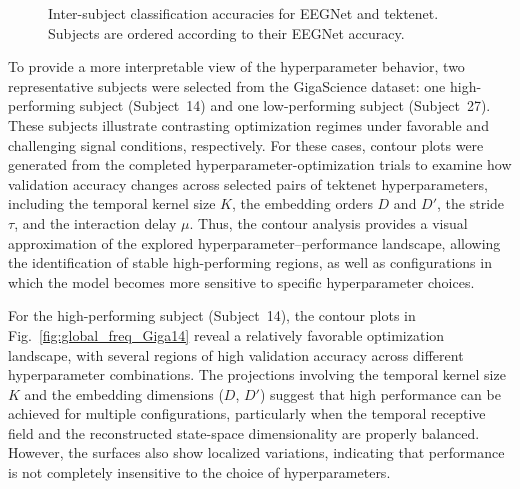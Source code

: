 \begin{figure}[htbp]
{
}
\caption{{Inter-subject classification accuracies for EEGNet and \gls{tektenet}. Subjects are ordered according to their EEGNet accuracy.}}
\label{fig:acc_eegnet_vs_tekte}
\end{figure}

{To provide a more interpretable view of the hyperparameter behavior, two representative subjects were selected from the GigaScience dataset: one high-performing subject (Subject~14) and one low-performing subject (Subject~27). These subjects illustrate contrasting optimization regimes under favorable and challenging signal conditions, respectively. For these cases, contour plots were generated from the completed hyperparameter-optimization trials to examine how validation accuracy changes across selected pairs of \gls{tektenet} hyperparameters, including the temporal kernel size $K$, the embedding orders $D$ and $D'$, the stride $\tau$, and the interaction delay $\mu$. Thus, the contour analysis provides a visual approximation of the explored hyperparameter--performance landscape, allowing the identification of stable high-performing regions, as well as configurations in which the model becomes more sensitive to specific hyperparameter choices.}

{For the high-performing subject (Subject~14), the contour plots in Fig.~\ref{fig:global_freq_Giga14} reveal a relatively favorable optimization landscape, with several regions of high validation accuracy across different hyperparameter combinations. The projections involving the temporal kernel size $K$ and the embedding dimensions ($D$, $D'$) suggest that high performance can be achieved for multiple configurations, particularly when the temporal receptive field and the reconstructed state-space dimensionality are properly balanced. However, the surfaces also show localized variations, indicating that performance is not completely insensitive to the choice of hyperparameters.}

